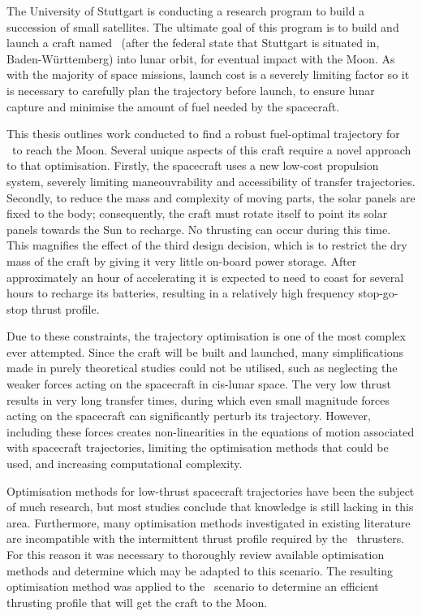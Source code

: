 
\vfill

The University of Stuttgart is conducting a research program to build a succession of small satellites. The ultimate goal of this program is to build and launch a craft named \BW\ (after the federal state that Stuttgart is situated in, Baden-W\"{u}rttemberg) into lunar orbit, for eventual impact with the Moon. As with the majority of space missions, launch cost is a severely limiting factor so it is necessary to carefully plan the trajectory before launch, to ensure lunar capture and minimise the amount of fuel needed by the spacecraft.

This thesis outlines work conducted to find a robust fuel-optimal trajectory for \BW\ to reach the Moon. Several unique aspects of this craft require a novel approach to that optimisation. Firstly, the spacecraft uses a new low-cost propulsion system, severely limiting maneouvrability and accessibility of transfer trajectories. Secondly, to reduce the mass and complexity of moving parts, the solar panels are fixed to the body; consequently, the craft must rotate itself to point its solar panels towards the Sun to recharge. No thrusting can occur during this time. This magnifies the effect of the third design decision, which is to restrict the dry mass of the craft by giving it very little on-board power storage. After approximately an hour of accelerating it is expected to need to coast for several hours to recharge its batteries, resulting in a relatively high frequency stop-go-stop thrust profile.

Due to these constraints, the trajectory optimisation is one of the most complex ever attempted. Since the craft will be built and launched, many simplifications made in purely theoretical studies could not be utilised, such as neglecting the weaker forces acting on the spacecraft in cis-lunar space. The very low thrust results in very long transfer times, during which even small magnitude forces acting on the spacecraft can significantly perturb its trajectory. However, including these forces creates non-linearities in the equations of motion associated with spacecraft trajectories, limiting the optimisation methods that could be used, and increasing computational complexity.

Optimisation methods for low-thrust spacecraft trajectories have been the subject of much research, but most studies conclude that knowledge is still lacking in this area. Furthermore, many optimisation methods investigated in existing literature are incompatible with the intermittent thrust profile required by the \BW\ thrusters. For this reason it was necessary to thoroughly review available optimisation methods and determine which may be adapted to this scenario. The resulting optimisation method was applied to the \BW\ scenario to determine an efficient thrusting profile that will get the craft to the Moon.

